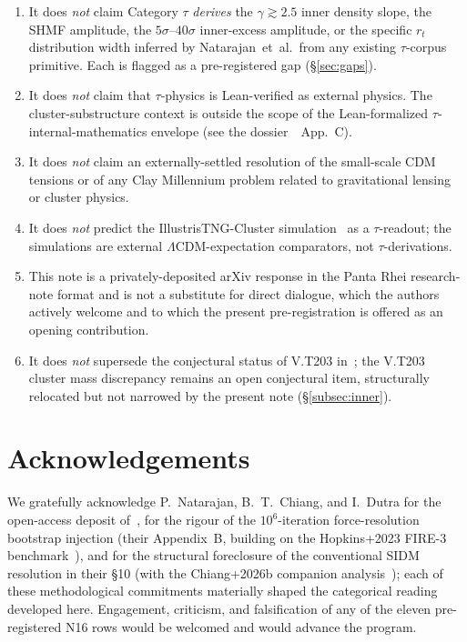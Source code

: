 \documentclass{pantarhei-researchnote}
\begin{document}
\begin{enumerate}[leftmargin=1.4em,itemsep=0.2em]
\item It does \emph{not} claim Category $\tau$ \emph{derives} the
$\gamma \gtrsim 2.5$ inner density slope, the SHMF amplitude, the
$5\sigma$--$40\sigma$ inner-excess amplitude, or the specific $r_t$
distribution width inferred by Natarajan~et~al.\ from any existing
$\tau$-corpus primitive. Each is flagged as a pre-registered gap
(\S\ref{sec:gaps}).
\item It does \emph{not} claim that $\tau$-physics is Lean-verified
as external physics. The cluster-substructure context is outside the
scope of the Lean-formalized $\tau$-internal-mathematics envelope
(see the dossier~\cite{BareMetalSpineV2}~App.~C).
\item It does \emph{not} claim an externally-settled resolution of the
small-scale CDM tensions or of any Clay Millennium problem related to
gravitational lensing or cluster physics.
\item It does \emph{not} predict the IllustrisTNG-Cluster
simulation~\cite{NelsonTNGC2024} as a $\tau$-readout; the simulations
are external $\Lambda$CDM-expectation comparators, not $\tau$-derivations.
\item This note is a privately-deposited arXiv response in the Panta Rhei
research-note format and is not a substitute for direct dialogue, which
the authors actively welcome and to which the present pre-registration
is offered as an opening contribution.
\item It does \emph{not} supersede the conjectural status of V.T203
in~\cite{KSZCategorical}; the V.T203 cluster mass discrepancy remains
an open conjectural item, structurally relocated but not narrowed
by the present note (\S\ref{subsec:inner}).
\end{enumerate}


\section*{Acknowledgements}

We gratefully acknowledge P.~Natarajan, B.~T.~Chiang, and I.~Dutra for the
open-access deposit of~\cite{Natarajan2026}, for the rigour of the
$10^6$-iteration force-resolution bootstrap injection (their Appendix~B,
building on the Hopkins+2023 FIRE-3 benchmark~\cite{Hopkins2023}), and
for the structural foreclosure of the conventional SIDM resolution in
their \S{}10 (with the Chiang+2026b companion
analysis~\cite{ChiangSimResolution2026}); each of these methodological
commitments materially shaped the categorical reading developed here.
Engagement, criticism, and falsification of any of the eleven
pre-registered N16 rows would be welcomed and would advance the program.



\end{document}
